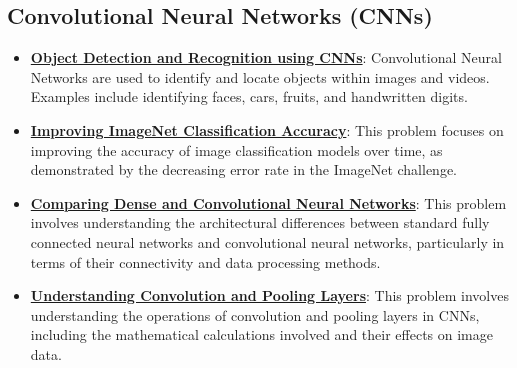 \documentclass{article}%
\begin{document}
\subsection{Convolutional Neural Networks (CNNs)}%
\label{subsec:ConvolutionalNeuralNetworks(CNNs)}%
\begin{itemize}[leftmargin=*]%
\item \href{https://purdue.brightspace.com/d2l/common/assets/pdfjs-d2l-dist/1.0.14-legacy/web/viewer.html?file=\%2Fcontent\%2Fenforced\%2F1095467-wl.202510.CS.24300.001\%2F09L1-cnn.pdf\%3Fou\%3D1095467\&lang=en-us\&container=d2l-fileviewer-rendered-pdf\&fullscreen=d2l-fileviewer-rendered-pdf-dialog\&height=667#page=2}{\textbf{Object Detection and Recognition using CNNs}}: Convolutional Neural Networks are used to identify and locate objects within images and videos. Examples include identifying faces, cars, fruits, and handwritten digits.%
\item \href{https://purdue.brightspace.com/d2l/common/assets/pdfjs-d2l-dist/1.0.14-legacy/web/viewer.html?file=\%2Fcontent\%2Fenforced\%2F1095467-wl.202510.CS.24300.001\%2F09L1-cnn.pdf\%3Fou\%3D1095467\&lang=en-us\&container=d2l-fileviewer-rendered-pdf\&fullscreen=d2l-fileviewer-rendered-pdf-dialog\&height=667#page=3}{\textbf{Improving ImageNet Classification Accuracy}}: This problem focuses on improving the accuracy of image classification models over time, as demonstrated by the decreasing error rate in the ImageNet challenge.%
\item \href{https://purdue.brightspace.com/d2l/common/assets/pdfjs-d2l-dist/1.0.14-legacy/web/viewer.html?file=\%2Fcontent\%2Fenforced\%2F1095467-wl.202510.CS.24300.001\%2F09L1-cnn.pdf\%3Fou\%3D1095467\&lang=en-us\&container=d2l-fileviewer-rendered-pdf\&fullscreen=d2l-fileviewer-rendered-pdf-dialog\&height=667#page=4}{\textbf{Comparing Dense and Convolutional Neural Networks}}: This problem involves understanding the architectural differences between standard fully connected neural networks and convolutional neural networks, particularly in terms of their connectivity and data processing methods.%
\item \href{https://purdue.brightspace.com/d2l/common/assets/pdfjs-d2l-dist/1.0.14-legacy/web/viewer.html?file=\%2Fcontent\%2Fenforced\%2F1095467-wl.202510.CS.24300.001\%2F09L1-cnn.pdf\%3Fou\%3D1095467\&lang=en-us\&container=d2l-fileviewer-rendered-pdf\&fullscreen=d2l-fileviewer-rendered-pdf-dialog\&height=667#page=6}{\textbf{Understanding Convolution and Pooling Layers}}: This problem involves understanding the operations of convolution and pooling layers in CNNs, including the mathematical calculations involved and their effects on image data.%

\end{itemize}
\end{document}

